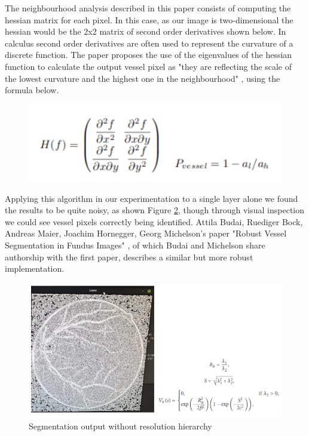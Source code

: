 \documentclass[conference]{IEEEtran}
\begin{document}
\par
The neighbourhood analysis described in this paper consists of computing the hessian matrix for each pixel. In this case, as our image is two-dimensional the hessian would be the 2x2 matrix of second order derivatives shown below. In calculus second order derivatives are often used to represent the curvature of a discrete function. The paper proposes the use of the eigenvalues of the hessian function to calculate the output vessel pixel as "they are reflecting the scale of the lowest curvature and the highest one in the neighbourhood" \cite{21}, using the formula below.

\begin{figure}[H]
	\centering
	\includegraphics[width=\linewidth]{image/hes.PNG}
	\label{fig:hes}
\end{figure}

\par

Applying this algorithm in our experimentation to a single layer alone we found the results to be quite noisy, as shown Figure  \ref{fig:fig1}, though through visual inspection we could see vessel pixels correctly being identified. Attila Budai, Ruediger Bock, Andreas Maier, Joachim Hornegger, Georg Michelson's paper "Robust Vessel Segmentation in Fundus Images" \cite{22}, of which Budai and Michelson share authorship with the first paper, describes a similar but more robust implementation.

\begin{figure}[H]
	\centering
	\includegraphics[width=\linewidth]{image/fig1.PNG}
	\caption{Segmentation output without resolution hierarchy}
	\label{fig:fig1}
\end{figure}
\end{document}
